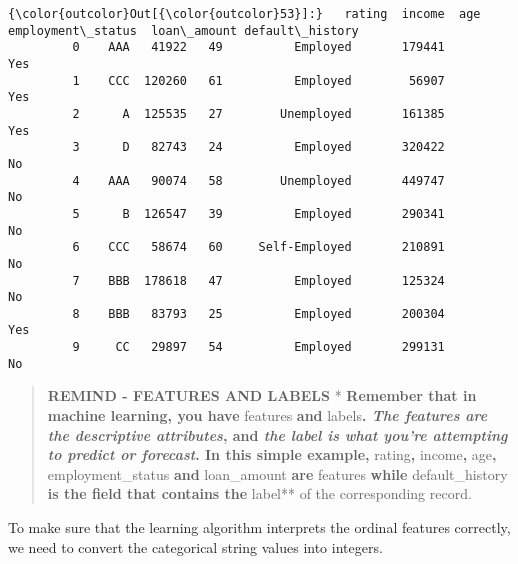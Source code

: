 \documentclass{article}
\begin{document}
\begin{Verbatim}[commandchars=\\\{\}]
{\color{outcolor}Out[{\color{outcolor}53}]:}   rating  income  age employment\_status  loan\_amount default\_history
         0    AAA   41922   49          Employed       179441             Yes
         1    CCC  120260   61          Employed        56907             Yes
         2      A  125535   27        Unemployed       161385             Yes
         3      D   82743   24          Employed       320422              No
         4    AAA   90074   58        Unemployed       449747              No
         5      B  126547   39          Employed       290341              No
         6    CCC   58674   60     Self-Employed       210891              No
         7    BBB  178618   47          Employed       125324              No
         8    BBB   83793   25          Employed       200304             Yes
         9     CC   29897   54          Employed       299131              No
\end{Verbatim}
    \begin{quote}
\textbf{REMIND - FEATURES AND LABELS} *\textbf{ Remember that in machine
learning, you have }features\textbf{ and }labels\textbf{. \emph{The
features are the \textbf{descriptive} attributes}, and \emph{the label
is what you're attempting to predict or forecast}. In this simple
example, }rating\textbf{, }income\textbf{, }age\textbf{,
}employment\_status\textbf{ and }loan\_amount\textbf{ are
}features\textbf{ while }default\_history\textbf{ is the field that
contains the }label** of the corresponding record.
\end{quote}

    To make sure that the learning algorithm interprets the ordinal features
correctly, we need to convert the categorical string values into
integers.
\end{document}
